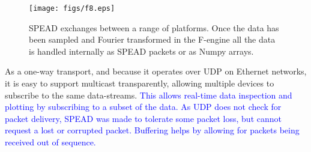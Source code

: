 \label{sec:SPEAD}
\begin{figure}
\texttt{[image: figs/f8.eps]} 
\caption{SPEAD exchanges between a range of platforms. Once the data has been sampled and Fourier transformed in the F-engine all the data is handled internally as SPEAD packets or as Numpy arrays.}
\label{fig:SPEAD}
\end{figure}

As a one-way transport, and because it operates over UDP on Ethernet
networks, it is easy to support multicast transparently, allowing
multiple devices to subscribe to the same data-streams.
\textcolor{blue}{This allows
real-time data inspection and plotting by subscribing to a subset of the 
data. As UDP does not check for packet delivery, SPEAD was made to tolerate
some packet loss, but cannot request a lost or corrupted packet.
Buffering helps by allowing for packets being received out of sequence.}


